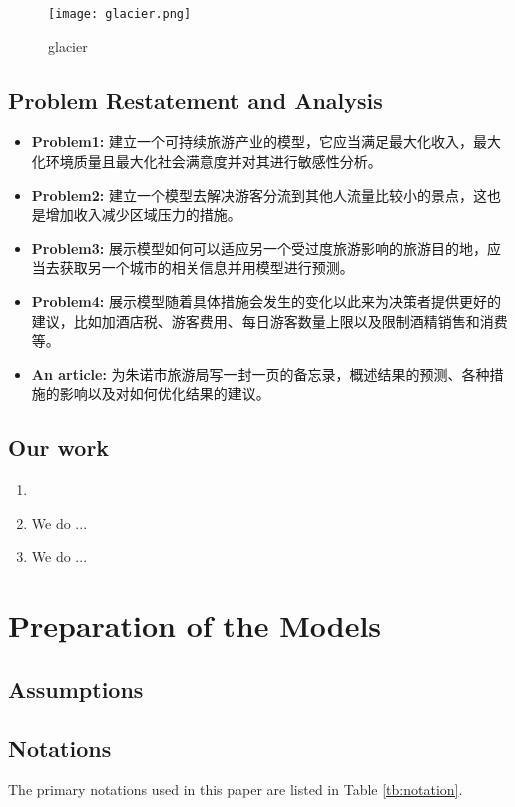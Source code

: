 \documentclass[12pt]{article}  %
\begin{document}
\begin{figure}[H]
	\centering
	\texttt{[image: glacier.png]}
	\caption{glacier}\label{fig:glacier}
\end{figure}

\subsection{Problem Restatement and Analysis}
\begin{itemize}
    \item \textbf{Problem1: }建立一个可持续旅游产业的模型，它应当满足最大化收入，最大化环境质量且最大化社会满意度并对其进行敏感性分析。
    \item \textbf{Problem2: }建立一个模型去解决游客分流到其他人流量比较小的景点，这也是增加收入减少区域压力的措施。
    \item \textbf{Problem3: }展示模型如何可以适应另一个受过度旅游影响的旅游目的地，应当去获取另一个城市的相关信息并用模型进行预测。
    \item \textbf{Problem4: }展示模型随着具体措施会发生的变化以此来为决策者提供更好的建议，比如加酒店税、游客费用、每日游客数量上限以及限制酒精销售和消费等。
    \item \textbf{An article: }为朱诺市旅游局写一封一页的备忘录，概述结果的预测、各种措施的影响以及对如何优化结果的建议。
\end{itemize}

\subsection{Our work}
\begin{enumerate}[\bfseries 1)]
    \item 
    \item We do ...
    \item We do ...
\end{enumerate}

\section{Preparation of the Models}
\subsection{Assumptions}

\subsection{Notations}
The primary notations used in this paper are listed in Table \ref{tb:notation}.
\end{document}

